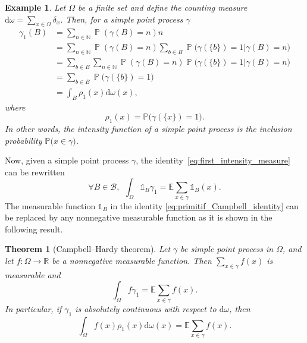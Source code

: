 \documentclass[twoside,11pt]{book}
\newtheorem{theorem}{Theorem}
\newtheorem{example}{Example}
\numberwithin{theorem}{chapter}
\numberwithin{definition}{chapter}
\numberwithin{proposition}{chapter}
\numberwithin{corollary}{chapter}
\numberwithin{example}{chapter}
\numberwithin{lemma}{chapter}
\DeclareMathOperator{\Prb}{\mathbb{P}}
\begin{document}
\begin{example}\label{ex:rho_1_inclustion_probability_discret_set}
Let $\Omega$ be a finite set and define the counting measure $\mathrm{d}\omega = \sum\limits_{x \in \Omega} \delta_x$. Then, for a simple point process $\gamma$
\begin{align}
\gamma_1(B) & = \sum\limits_{n \in \mathbb{N}} \Prb(\gamma(B) = n) n\\
& = \sum\limits_{n \in \mathbb{N}} \Prb(\gamma(B) = n) \sum\limits_{b \in B} \Prb \big( \gamma(\{b\}) = 1| \gamma(B) = n \big) \nonumber\\
& = \sum\limits_{b \in B} \sum\limits_{n \in \mathbb{N}} \Prb(\gamma(B) = n)  \Prb \big( \gamma(\{b\}) = 1| \gamma(B) = n \big) \nonumber\\
& = \sum\limits_{b \in B}  \Prb \big( \gamma(\{b\}) = 1\big) \nonumber\\
& = \int_{B} \rho_{1}(x) \mathrm{d}\omega(x), \nonumber
\end{align}
where 
\begin{equation}
\rho_{1}(x) = \mathbb{P} \big(\gamma(\{x\}) = 1 \big).
\end{equation}
In other words, the intensity function of a simple point process is the inclusion probability $\mathbb{P} \big(x \in \gamma \big)$.

\end{example}


Now, given a simple point process $\gamma$, the identity~\eqref{eq:first_intensity_measure} can be rewritten 
\begin{equation}\label{eq:primitif_Campbell_identity}
\forall B \in \mathcal{B}, \:\:\int_{\Omega} \mathbb{1}_{B} \gamma_1 = \mathbb{E}\sum\limits_{x \in \gamma} \mathbb{1}_{B}(x).
\end{equation}
The measurable function $\mathbb{1}_{B}$ in the identity \eqref{eq:primitif_Campbell_identity} can be replaced by any nonnegative measurable function as it is shown in the following result.


\begin{theorem}[Campbell–Hardy theorem]
Let $\gamma$ be simple point process in $\Omega$, and let $f: \Omega \rightarrow \mathbb{R}$ be a nonnegative measurable function. Then  $\sum\limits_{x \in \gamma} f(x)$ is measurable and 
\begin{equation}
\int_{\Omega} f \gamma_1 = \mathbb{E}\sum\limits_{x \in \gamma} f(x).
\end{equation}
In particular, if $\gamma_1$ is absolutely continuous with respect to $\mathrm{d}\omega$, then
\begin{equation}
\int_{\Omega} f(x) \rho_1(x) \mathrm{d}\omega(x) = \mathbb{E}\sum\limits_{x \in \gamma} f(x).
\end{equation}


\end{theorem}
\end{document}
